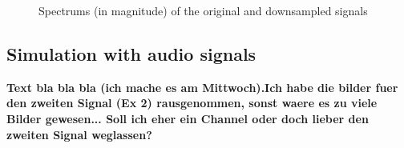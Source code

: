 \begin{figure}[!h]
	\caption{Spectrums (in magnitude) of the original and downsampled signals}%
	\label{fig:downsamplingSinusSpectrum}%
\end{figure}

\subsection{Simulation with audio signals}

\textbf{Text bla bla bla (ich mache es am Mittwoch).Ich habe die bilder fuer den zweiten Signal (Ex 2) rausgenommen, sonst waere es zu viele Bilder gewesen... Soll ich eher ein Channel oder doch lieber den zweiten Signal weglassen?}

\begin{figure}[!h]%
	\centering
\end{figure}
